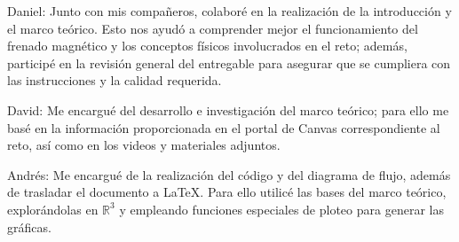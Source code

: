 Daniel: Junto con mis compañeros, colaboré en la realización de la introducción y el marco teórico. Esto nos ayudó a comprender mejor el funcionamiento del frenado magnético y los conceptos físicos involucrados en el reto; además, participé en la revisión general del entregable para asegurar que se cumpliera con las instrucciones y la calidad requerida.

David: Me encargué del desarrollo e investigación del marco teórico; para ello me basé en la información proporcionada en el portal de Canvas correspondiente al reto, así como en los videos y materiales adjuntos.

Andrés: Me encargué de la realización del código y del diagrama de flujo, además de trasladar el documento a \LaTeX. Para ello utilicé las bases del marco teórico, explorándolas en $\mathbb{R}^3$ y empleando funciones especiales de ploteo para generar las gráficas.

